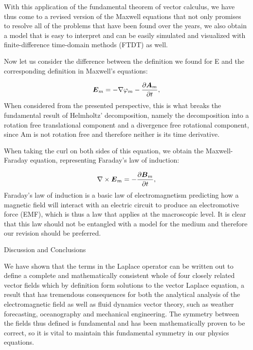 \documentclass{article}
\newcommand\boldsubformula[1]{\text{\mathversion{bold}$#1$}}
\begin{document}
With this application of the fundamental theorem of vector calculus, we have thus come to a revised version of the
Maxwell equations that not only promises to resolve all of the problems that have been found over the years, we also
obtain a model that is easy to interpret and can be easily simulated and visualized with finite-difference time-domain
methods (FTDT) as well. 

Now let us consider the difference between the definition we found for E and the corresponding definition in Maxwell's
equations:

\begin{equation}
\boldsubformula E_m=-\nabla \varphi _m-\frac{\partial \boldsubformula A_m}{\partial t},
\end{equation}
When considered from the presented perspective, this is what breaks the fundamental result of Helmholtz' decomposition,
namely the decomposition into a rotation free translational component and a divergence free rotational component, since
Am is not rotation free and therefore neither is its time derivative.  

When taking the curl on both sides of this equation, we obtain the Maxwell-Faraday equation, representing Faraday's law
of induction:

\begin{equation}
\nabla \times \boldsubformula E_m=-\frac{\partial \boldsubformula B_m}{\partial t},
\end{equation}
Faraday's law of induction is a basic law of electromagnetism predicting how a magnetic field will interact with an
electric circuit to produce an electromotive force (EMF), which is thus a law that applies at the macroscopic level. It
is clear that this law should not be entangled with a model for the medium and therefore our revision should be
preferred.  

Discussion and Conclusions

We have shown that the terms in the Laplace operator can be written out to define a complete and mathematically
consistent whole of four closely related vector fields which by definition form solutions to the vector Laplace
equation, a result that has tremendous consequences for both the analytical analysis of the electromagnetic field as
well as fluid dynamics vector theory, such as weather forecasting, oceanography and mechanical engineering. The
symmetry between the fields thus defined is fundamental and has been mathematically proven to be correct, so it is
vital to maintain this fundamental symmetry in our physics equations.  
\end{document}
